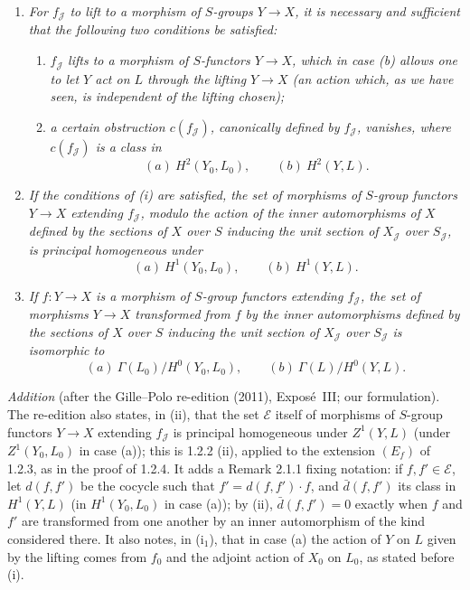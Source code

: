 \begin{enumerate}
\item[(i)] \textit{For \(f_{\mathscr J}\) to lift to a morphism of \(S\)-groups
  \(Y\to X\), it is necessary and sufficient that the following two conditions
  be satisfied:}
  \begin{enumerate}
  \item[(i\(_1\))] \textit{\(f_{\mathscr J}\) lifts to a morphism of
    \(S\)-functors \(Y\to X\), which in case (b) allows one to let \(Y\) act on
    \(L\) through the lifting \(Y\to X\) (an action which, as we have seen, is
    independent of the lifting chosen);}
  \item[(i\(_2\))] \textit{a certain obstruction \(c(f_{\mathscr J})\),
    canonically defined by \(f_{\mathscr J}\), vanishes, where
    \(c(f_{\mathscr J})\) is a class in}
    \[
     (a)\ H^2(Y_0,L_0),\qquad (b)\ H^2(Y,L).
    \]
  \end{enumerate}
\item[\SGAInlineRefTarget{sga3:iii:theorem:2-1:item:ii}(ii)] \textit{If the conditions of (i) are satisfied, the set
  of morphisms of \(S\)-group functors \(Y\to X\) extending
  \(f_{\mathscr J}\), modulo the action of the inner automorphisms of \(X\)
  defined by the sections of \(X\) over \(S\) inducing the unit section of
  \(X_{\mathscr J}\) over \(S_{\mathscr J}\), is principal homogeneous under}
  \[
   (a)\ H^1(Y_0,L_0),\qquad (b)\ H^1(Y,L).
  \]
\item[\SGAInlineRefTarget{sga3:iii:theorem:2-1:item:iii}(iii)] \textit{If \(f:Y\to X\) is a morphism of
  \(S\)-group functors extending \(f_{\mathscr J}\), the set of morphisms
  \(Y\to X\) transformed from \(f\) by the inner automorphisms defined by the
  sections of \(X\) over \(S\) inducing the unit section of
  \(X_{\mathscr J}\) over \(S_{\mathscr J}\) is isomorphic to}
  \[
   (a)\ \Gamma(L_0)/H^0(Y_0,L_0),\qquad (b)\ \Gamma(L)/H^0(Y,L).
  \]
\end{enumerate}

\emph{Addition} (after the Gille--Polo re-edition (2011), Exposé~III; our
formulation). The re-edition also states, in (ii), that the set
\(\mathcal E\) itself of morphisms of \(S\)-group functors \(Y\to X\) extending
\(f_{\mathscr J}\) is principal homogeneous under \(Z^1(Y,L)\) (under
\(Z^1(Y_0,L_0)\) in case (a)); this is 1.2.2 (ii), applied to the extension
\((E_f)\) of 1.2.3, as in the proof of 1.2.4. It adds a Remark 2.1.1 fixing
notation: if \(f,f'\in\mathcal E\), let \(d(f,f')\) be the cocycle such that
\(f'=d(f,f')\cdot f\), and \(\bar d(f,f')\) its class in \(H^1(Y,L)\) (in
\(H^1(Y_0,L_0)\) in case (a)); by (ii), \(\bar d(f,f')=0\) exactly when \(f\)
and \(f'\) are transformed from one another by an inner automorphism of the
kind considered there. It also notes, in (i\(_1\)), that in case (a) the
action of \(Y\) on \(L\) given by the lifting comes from \(f_0\) and the
adjoint action of \(X_0\) on \(L_0\), as stated before (i).


